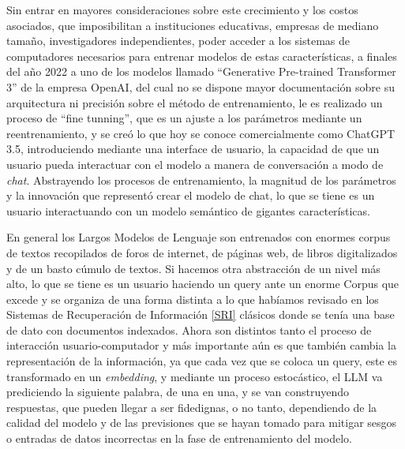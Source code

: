\documentclass[
  10,
  openany]{book}
\begin{document}
Sin entrar en mayores consideraciones sobre este crecimiento y los costos asociados, que imposibilitan a instituciones educativas, empresas de mediano tamaño, investigadores independientes, poder acceder a los sistemas de computadores necesarios para entrenar modelos de estas características, a finales del año 2022 a uno de los modelos llamado ``Generative Pre-trained Transformer 3'' de la empresa OpenAI, del cual no se dispone mayor documentación sobre su arquitectura ni precisión sobre el método de entrenamiento, le es realizado un proceso de ``fine tunning'', que es un ajuste a los parámetros mediante un reentrenamiento, y se creó lo que hoy se conoce comercialmente como ChatGPT 3.5, introduciendo mediante una interface de usuario, la capacidad de que un usuario pueda interactuar con el modelo a manera de conversación a modo de \emph{chat}. Abstrayendo los procesos de entrenamiento, la magnitud de los parámetros y la innovación que representó crear el modelo de chat, lo que se tiene es un usuario interactuando con un modelo semántico de gigantes características.

En general los Largos Modelos de Lenguaje son entrenados con enormes corpus de textos recopilados de foros de internet, de páginas web, de libros digitalizados y de un basto cúmulo de textos. Si hacemos otra abstracción de un nivel más alto, lo que se tiene es un usuario haciendo un query ante un enorme Corpus que excede y se organiza de una forma distinta a lo que habíamos revisado en los Sistemas de Recuperación de Información \ref{SRI} clásicos donde se tenía una base de dato con documentos indexados. Ahora son distintos tanto el proceso de interacción usuario-computador y más importante aún es que también cambia la representación de la información, ya que cada vez que se coloca un query, este es transformado en un \emph{embedding}, y mediante un proceso estocástico, el LLM va prediciendo la siguiente palabra, de una en una, y se van construyendo respuestas, que pueden llegar a ser fidedignas, o no tanto, dependiendo de la calidad del modelo y de las previsiones que se hayan tomado para mitigar sesgos o entradas de datos incorrectas en la fase de entrenamiento del modelo.
\end{document}
